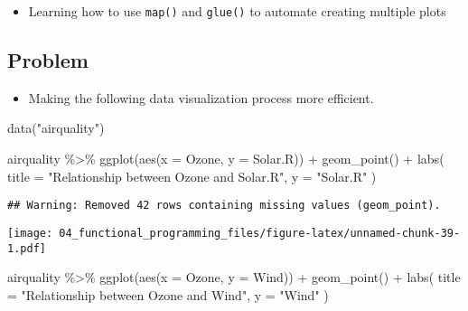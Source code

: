 \documentclass[
]{book}
\newenvironment{Shaded}{\begin{snugshade}}{\end{snugshade}}
\newcommand{\AttributeTok}[1]{\textcolor[rgb]{0.77,0.63,0.00}{#1}}
\newcommand{\FunctionTok}[1]{\textcolor[rgb]{0.00,0.00,0.00}{#1}}
\newcommand{\NormalTok}[1]{#1}
\newcommand{\SpecialCharTok}[1]{\textcolor[rgb]{0.00,0.00,0.00}{#1}}
\newcommand{\StringTok}[1]{\textcolor[rgb]{0.31,0.60,0.02}{#1}}
\providecommand{\tightlist}{%
  \setlength{\itemsep}{0pt}\setlength{\parskip}{0pt}}
\begin{document}
\begin{itemize}
\tightlist
\item
  Learning how to use \texttt{map()} and \texttt{glue()} to automate creating multiple plots
\end{itemize}

\hypertarget{problem-1}{%
\subsection{Problem}\label{problem-1}}

\begin{itemize}
\tightlist
\item
  Making the following data visualization process more efficient.
\end{itemize}

\begin{Shaded}
\begin{Highlighting}[]
\FunctionTok{data}\NormalTok{(}\StringTok{"airquality"}\NormalTok{)}

\NormalTok{airquality }\SpecialCharTok{\%\textgreater{}\%}
  \FunctionTok{ggplot}\NormalTok{(}\FunctionTok{aes}\NormalTok{(}\AttributeTok{x =}\NormalTok{ Ozone, }\AttributeTok{y =}\NormalTok{ Solar.R)) }\SpecialCharTok{+}
  \FunctionTok{geom\_point}\NormalTok{() }\SpecialCharTok{+}
  \FunctionTok{labs}\NormalTok{(}
    \AttributeTok{title =} \StringTok{"Relationship between Ozone and Solar.R"}\NormalTok{,}
    \AttributeTok{y =} \StringTok{"Solar.R"}
\NormalTok{  )}
\end{Highlighting}
\end{Shaded}

\begin{verbatim}
## Warning: Removed 42 rows containing missing values (geom_point).
\end{verbatim}

\texttt{[image: 04\_functional\_programming\_files/figure-latex/unnamed-chunk-39-1.pdf]}

\begin{Shaded}
\begin{Highlighting}[]
\NormalTok{airquality }\SpecialCharTok{\%\textgreater{}\%}
  \FunctionTok{ggplot}\NormalTok{(}\FunctionTok{aes}\NormalTok{(}\AttributeTok{x =}\NormalTok{ Ozone, }\AttributeTok{y =}\NormalTok{ Wind)) }\SpecialCharTok{+}
  \FunctionTok{geom\_point}\NormalTok{() }\SpecialCharTok{+}
  \FunctionTok{labs}\NormalTok{(}
    \AttributeTok{title =} \StringTok{"Relationship between Ozone and Wind"}\NormalTok{,}
    \AttributeTok{y =} \StringTok{"Wind"}
\NormalTok{  )}
\end{Highlighting}
\end{Shaded}
\end{document}
